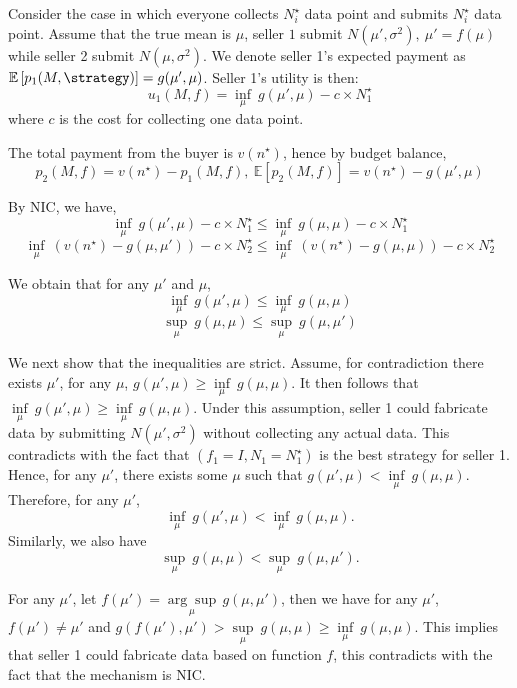 Consider the case in which everyone collects $N_i^{\star}$ data point and submits $N_i^{\star}$ data point. Assume that the true mean is $\mu$, seller $1$ submit $N({\mu}', \sigma^2),\ {\mu}' = f(\mu) $ while seller 2 submit $N({\mu}, \sigma^2) $. We denote seller 1's expected payment as  $\mathbb{E}\left[ p_1(M,\strategy) \right] = g({\mu}', \mu)$.
Seller 1's utility is then:
\[ u_1(M,f) = \underset{\mu}{\inf} \ g({\mu}', \mu) -c\times N_1^{\star}\] where $c$ is the cost for collecting one data point.


The total payment from the buyer is $v(n^{\star})$, hence by budget balance, \[p_2 (M,f)  = v(n^{\star}) -  p_1(M,f), \ \mathbb{E}\left[ p_2(M,f) \right] = v(n^{\star}) - g({\mu}', \mu) \]

By NIC, we have,
\[ \underset{\mu}{\inf} \ g({\mu}', \mu) -c\times N_1^{\star} \leq \underset{\mu}{\inf} \ g({\mu}, \mu) -c\times N_1^{\star} \] \[ \underset{\mu}{\inf} \ (v(n^{\star})- g( \mu, {\mu}')) -c\times N_2^{\star} \leq \underset{\mu}{\inf} \ (v(n^{\star})-g( \mu, {\mu})) -c\times N_2^{\star}  \]

We obtain that for any ${\mu}'$ and $\mu$,
\[  \underset{\mu}{\inf} \ g({\mu}', \mu) \leq \underset{\mu}{\inf} \ g({\mu}, \mu)   \] \[  \underset{\mu}{\sup} \  g( \mu, {\mu})  \leq \underset{\mu}{\sup } \ g( \mu, {\mu}')  \]

We next show that the inequalities are strict. Assume, for contradiction there exists ${\mu}'$, for any $\mu$, $g({\mu}', 
\mu) \geq \underset{\mu}{\inf} \ g({\mu}, \mu)$. It then follows that $ \underset{\mu}{\inf} \ g({\mu}', \mu) \geq \underset{\mu}{\inf} \ g({\mu}, \mu)$. Under this assumption, seller 1 could fabricate data by submitting $N({\mu}', \sigma^2)$ without collecting any actual data. This contradicts with the fact that $(f_1 = I, N_1 = N_1^{\star})$ is the best strategy for seller 1. Hence, for any ${\mu}'$, there exists some $\mu$ such that $g({\mu}', 
\mu) < \underset{\mu}{\inf} \ g({\mu}, \mu)$. Therefore, for any ${\mu}'$, \[ \underset{\mu}{\inf} \ g({\mu}', \mu) < \underset{\mu}{\inf} \ g({\mu}, \mu). \]Similarly, we also have \[ \underset{\mu}{\sup} \  g( \mu, {\mu})  < \underset{\mu}{\sup } \ g( \mu, {\mu}').  \] 


For any $ {\mu}'$, let $f({\mu}') =  \underset{\mu}{\arg\sup}\, g(\mu, {\mu}')$, then we have for any ${\mu}'$,  $f({\mu}') \neq {\mu}'$ and $ g(f({\mu}'), {\mu}') > \underset{\mu}{\sup} \  g( \mu, {\mu}) \geq  \underset{\mu}{\inf} \  g( \mu, {\mu})$. This implies that seller 1 could fabricate data based on function $f$, this contradicts with the fact that the mechanism is NIC.


